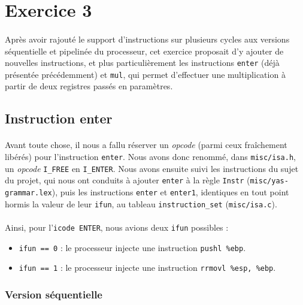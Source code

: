 \documentclass[12pt]{article}
\begin{document}
\section{Exercice 3}
\paragraph{}Après avoir rajouté le support d'instructions sur plusieurs cycles aux versions séquentielle et pipelinée du processeur, cet exercice proposait d'y ajouter de nouvelles instructions, et plus particulièrement les instructions \verb+enter+ (déjà présentée précédemment) et \verb+mul+, qui permet d'effectuer une multiplication à partir de deux registres passés en paramètres.

\subsection{Instruction enter}
\paragraph{}Avant toute chose, il nous a fallu réserver un {\itshape opcode} (parmi ceux fraîchement libérés) pour l'instruction \verb+enter+. Nous avons donc renommé, dans \verb+misc/isa.h+, un {\itshape opcode} \verb+I_FREE+ en \verb+I_ENTER+. Nous avons ensuite suivi les instructions du sujet du projet, qui nous ont conduits à ajouter \verb+enter+ à la règle \verb+Instr+ (\verb+misc/yas-grammar.lex+), puis les instructions \verb+enter+ et \verb+enter1+, identiques en tout point hormis la valeur de leur \verb+ifun+, au tableau \verb+instruction_set+ (\verb+misc/isa.c+).

\paragraph{}Ainsi, pour l'\verb+icode ENTER+, nous avions deux \verb+ifun+ possibles :
\begin{itemize}
\item \verb+ifun == 0+ : le processeur injecte une instruction \verb+pushl %ebp+.
  \item \verb+ifun == 1+ : le processeur injecte une instruction \verb+rrmovl %esp, %ebp+.
\end{itemize}

\subsubsection{Version séquentielle}
\end{document}
